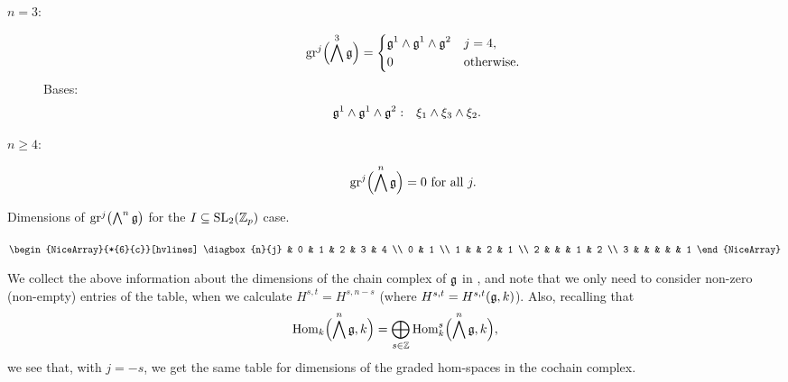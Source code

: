\begin{description}
  \item[$n=3:$]
        \begin{equation*}
          \operatorname{gr}^{j}\Bigl( \bigwedge^{3}\mathfrak{g} \Bigr) =
          \begin{dcases}
            \mathfrak{g}^{1} \wedge \mathfrak{g}^{1} \wedge \mathfrak{g}^{2} & j=4, \\ 0                                                & \text{otherwise.}
          \end{dcases}
        \end{equation*}
        Bases:
        \begin{align*}
          \mathfrak{g}^{1} \wedge \mathfrak{g}^{1} \wedge \mathfrak{g}^{2}: \quad & \xi_{1} \wedge \xi_{3} \wedge \xi_{2}.
        \end{align*}

   \item[$n\geq4:$]
        \begin{equation*}
          \operatorname{gr}^{j}\Bigl( \bigwedge^{n}\mathfrak{g} \Bigr) = 0 \text{ for all } j.
        \end{equation*}
\end{description}

\begin{table}[ht]
  \centering
  \caption[Graded complex dimensions for the $I \subseteq \SL_{2}(\Z_{p})$ case]{Dimensions of $\operatorname{gr}^{j}\bigl( \bigwedge^{n} \mathfrak{g} \bigr)$ for the $I \subseteq \SL_{2}(\Z_{p})$ case.}
  \label{tab:graded-dims-SL2}
  $\begin{NiceArray}{*{6}{c}}[hvlines]
    \diagbox{n}{j} & 0 & 1 & 2 & 3 & 4 \\
    0 & 1 \\
    1 & & 2 & 1 \\
    2 & & & 1 & 2 \\
    3 & & & & & 1
  \end{NiceArray}$
\end{table}

We collect the above information about the dimensions of the chain complex of $\mathfrak{g}$ in , and note that we only need to consider non-zero (non-empty) entries of the table, when we calculate  $H^{s,t} = H^{s,n-s}$ (where $H^{s,t} = H^{s,t}(\mathfrak{g},k)$). Also, recalling that
\begin{equation*}
  \operatorname{Hom}_{k}\Bigl( \bigwedge^{n}\mathfrak{g}, k \Bigr) = \bigoplus_{s \in \mathbb{Z}} \operatorname{Hom}_{k}^{s}\Bigl( \bigwedge^{n}\mathfrak{g}, k \Bigr),
\end{equation*}
we see that, with $j=-s$, we get the same table for dimensions of the graded hom-spaces in the cochain complex.

